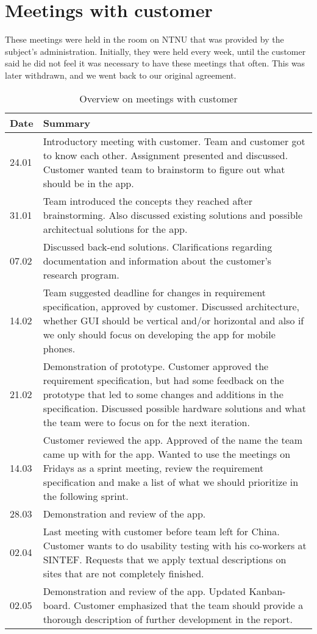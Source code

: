 \section{Meetings with customer}
These meetings were held in the room on NTNU that was provided by the subject's administration. Initially, they were held every week, until the customer said he did not feel it was necessary to have these meetings that often. This was later withdrawn, and we went back to our original agreement.
\begin{table}[H]
\centering
\begin{tabular}{|l|p{14.7cm}|}
\hline
\textbf{Date}&\textbf{Summary}\\\hline
24.01& Introductory meeting with customer. Team and customer got to know each other. Assignment presented and discussed. Customer wanted team to brainstorm to figure out what should be in the app.\\\hline
31.01& Team introduced the concepts they reached after brainstorming. Also discussed existing solutions and possible architectual solutions for the app.\\\hline
07.02& Discussed back-end solutions. Clarifications regarding documentation and information about the customer's research program.\\\hline
14.02& Team suggested deadline for changes in requirement specification, approved by customer. Discussed architecture, whether GUI should be vertical and/or horizontal and also if we only should focus on developing the app for mobile phones.\\\hline
21.02&Demonstration of prototype. Customer approved the requirement specification, but had some feedback on the prototype that led to some changes and additions in the specification. Discussed possible hardware solutions and what the team were to focus on for the next iteration. \\\hline
14.03& Customer reviewed the app. Approved of the name the team came up with for the app. Wanted to use the meetings on Fridays as a sprint meeting, review the requirement specification and make a list of what we should prioritize in the following sprint.\\\hline
28.03& Demonstration and review of the app.\\\hline
02.04& Last meeting with customer before team left for China. Customer wants to do usability testing with his co-workers at SINTEF. Requests that we apply textual descriptions on sites that are not completely finished.\\\hline
02.05& Demonstration and review of the app. Updated Kanban-board. Customer emphasized that the team should provide a thorough description of further development in the report. \\\hline
\end{tabular}
\caption{Overview on meetings with customer}
\end{table}







